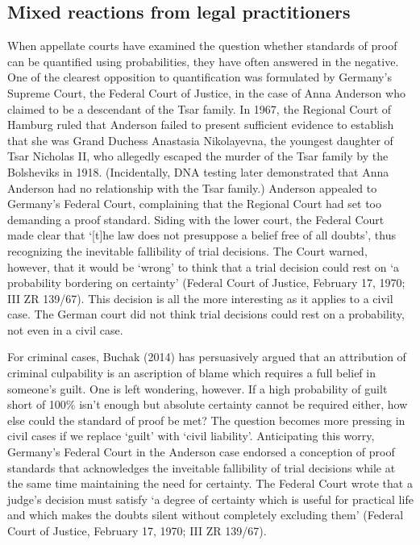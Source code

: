 \documentclass[10pt,dvipsnames,enabledeprecatedfontcommands]{scrartcl}
\begin{document}
\hypertarget{mixed-reactions-from-legal-practitioners}{%
\subsection{Mixed reactions from legal
practitioners}\label{mixed-reactions-from-legal-practitioners}}

When appellate courts have examined the question whether standards of
proof can be quantified using probabilities, they have often answered in
the negative. One of the clearest opposition to quantification was
formulated by Germany's Supreme Court, the Federal Court of Justice, in
the case of Anna Anderson who claimed to be a descendant of the Tsar
family. In 1967, the Regional Court of Hamburg ruled that Anderson
failed to present sufficient evidence to establish that she was Grand
Duchess Anastasia Nikolayevna, the youngest daughter of Tsar Nicholas
II, who allegedly escaped the murder of the Tsar family by the
Bolsheviks in 1918. (Incidentally, DNA testing later demonstrated that
Anna Anderson had no relationship with the Tsar family.) Anderson
appealed to Germany's Federal Court, complaining that the Regional Court
had set too demanding a proof standard. Siding with the lower court, the
Federal Court made clear that `{[}t{]}he law does not presuppose a
belief free of all doubts', thus recognizing the inevitable fallibility
of trial decisions. The Court warned, however, that it would be `wrong'
to think that a trial decision could rest on `a probability bordering on
certainty' (Federal Court of Justice, February 17, 1970; III ZR 139/67).
This decision is all the more interesting as it applies to a civil case.
The German court did not think trial decisions could rest on a
probability, not even in a civil case.

For criminal cases, Buchak (2014) has persuasively argued that an
attribution of criminal culpability is an ascription of blame which
requires a full belief in someone's guilt. One is left wondering,
however. If a high probability of guilt short of 100\% isn't enough but
absolute certainty cannot be required either, how else could the
standard of proof be met? The question becomes more pressing in civil
cases if we replace `guilt' with `civil liability'. Anticipating this
worry, Germany's Federal Court in the Anderson case endorsed a
conception of proof standards that acknowledges the inveitable
fallibility of trial decisions while at the same time maintaining the
need for certainty. The Federal Court wrote that a judge's decision must
satisfy `a degree of certainty which is useful for practical life and
which makes the doubts silent without completely excluding them'
(Federal Court of Justice, February 17, 1970; III ZR 139/67).
\end{document}
